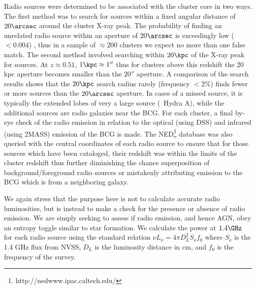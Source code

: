 \documentclass{emulateapj}
\begin{document}
Radio sources were determined to be associated with the cluster core in
two ways. The first method was to search for sources within a fixed
angular distance of $20\arcsec$ around the cluster X-ray peak. The
probability of finding an unrelated radio source within an aperture of
$20\arcsec$ is exceedingly low ($< 0.004$)
\citep{1998AJ....115.1693C}, thus in a sample of $\approx 200$
clusters we expect no more than one false match. The second method
involved searching within $20\kpc$ of the X-ray peak for sources. At
$z \approx 0.51$, $1 \kpc \approx 1''$ thus for clusters above this
redshift the 20 kpc aperture becomes smaller than the $20''$
aperture. A comparison of the search results shows that the $20\kpc$
search radius rarely (frequency $< 2\%$) finds fewer or more sources
than the $20\arcsec$ aperture. In cases of a missed source, it is
typically the extended lobes of very a large source (\eg\ Hydra A),
while the additional sources are radio galaxies near the BCG. For each
cluster, a final by-eye check of the radio emission in relation to the
optical (using DSS) and infrared (using 2MASS) emission of the BCG is
made. The NED\footnote{http://nedwww.ipac.caltech.edu/} database was also
queried with the central coordinates of each radio source to ensure
that for those sources which have been cataloged, their redshift was
within the limits of the cluster redshift thus further diminishing the
chance superposition of background/foreground radio sources or
mistakenly attributing emission to the BCG which is from a neighboring
galaxy.

We again stress that the purpose here is not to calculate accurate
radio luminosities, but is instead to make a check for the presence or
absence of radio emission. We are simply seeking to assess if radio
emission, and hence AGN, obey an entropy toggle similar to star
formation. We calculate the power at $1.4\GHz$ for each radio source
using the standard relation $\nu L_{\nu} = 4 \pi D_L^2 S_{\nu} f_0$
where $S_{\nu}$ is the 1.4 GHz flux from NVSS, $D_L$ is the luminosity
distance in cm, and $f_0$ is the frequency of the survey.

\end{document}
